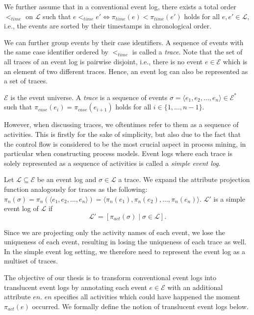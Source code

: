 We further assume that in a conventional event log, there exists a total order $<_{time}$ on $\mathcal{L}$ such that $e <_{time} e' \iff \pi_{time}(e) < \pi_{time}(e')$ holds for all $e, e' \in \mathcal{L}$, i.e., the events are sorted by their timestamps in chronological order.

We can further group events by their case identifiers. A sequence of events with the same case identifier ordered by $<_{time}$ is called a \emph{trace}. Note that the set of all traces of an event log is pairwise disjoint, i.e., there is no event $e \in \mathcal{E}$ which is an element of two different traces. Hence, an event log can also be represented as a set of traces.

\begin{definition}[Trace]
    $\mathcal{E}$ is the event universe. A \emph{trace} is a sequence of events $\sigma = \langle e_1, e_2, \dots, e_n \rangle \in \mathcal{E}^*$ such that $\pi_{case}(e_i) = \pi_{case}(e_{i+1})$ holds for all $i \in \{1, \dots, n-1\}$.
\end{definition}

However, when discussing traces, we oftentimes refer to them as a sequence of activities. This is firstly for the sake of simplicity, but also due to the fact that the control flow is considered to be the most crucial aspect in process mining, in particular when constructing process models. Event logs where each trace is solely represented as a sequence of activities is called a \emph{simple event log}.

\begin{definition}
    Let $\mathcal{L} \subseteq \mathcal{E}$ be an event log and $\sigma \in \mathcal{L}$ a trace. We expand the attribute projection function analogously for traces as the following: $\pi_n(\sigma) = \pi_n(\langle e_1, e_2, \dots, e_n \rangle) = \langle \pi_n(e_1), \pi_n(e_2), \dots, \pi_n(e_n) \rangle$. $\mathcal{L'}$ is a simple event log of $\mathcal{L}$ if
    \[
        \mathcal{L'} = \left[ \pi_{act}(\sigma) \mid \sigma \in \mathcal{L} \right].
    \]
\end{definition}

Since we are projecting only the activity names of each event, we lose the uniqueness of each event, resulting in losing the uniqueness of each trace as well. In the simple event log setting, we therefore need to represent the event log as a multiset of traces.

The objective of our thesis is to transform conventional event logs into translucent event logs by annotating each event $e \in \mathcal{E}$ with an additional attribute $en$. $en$ specifies all activities which could have happened the moment $\pi_{act}(e)$ occurred. We formally define the notion of translucent event logs below.

